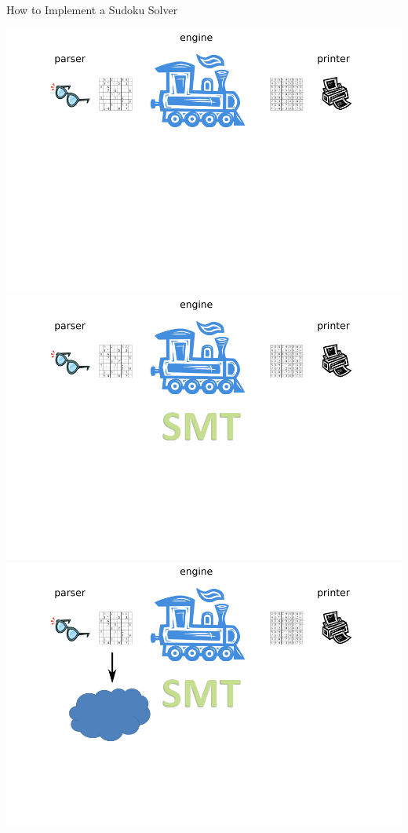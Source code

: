 \documentclass{beamer}
\begin{document}
\begin{frame}{How to Implement a Sudoku Solver}
\begin{overprint}
 \includegraphics[width=\textwidth]{current2}
 \includegraphics[width=\textwidth]{current3}
 \includegraphics[width=\textwidth]{current4}

\end{overprint}
\end{frame}
\end{document}
